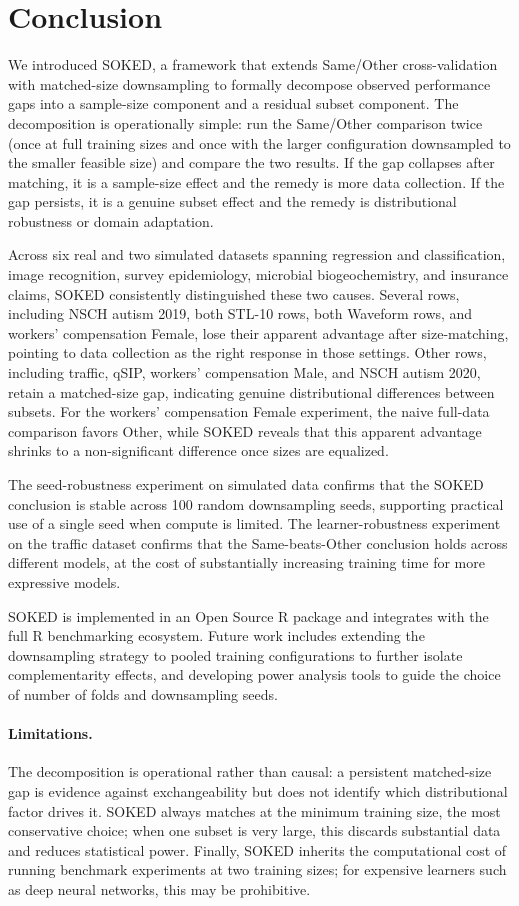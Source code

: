 \documentclass{article}
\begin{document}
\section{Conclusion}
We introduced SOKED, a framework that extends Same/Other cross-validation with matched-size downsampling to formally decompose observed performance gaps into a sample-size component and a residual subset component.
The decomposition is operationally simple: run the Same/Other comparison twice (once at full training sizes and once with the larger configuration downsampled to the smaller feasible size) and compare the two results.
If the gap collapses after matching, it is a sample-size effect and the remedy is more data collection.
If the gap persists, it is a genuine subset effect and the remedy is distributional robustness or domain adaptation.

Across six real and two simulated datasets spanning regression and classification, image recognition, survey epidemiology, microbial biogeochemistry, and insurance claims, SOKED consistently distinguished these two causes.
Several rows, including NSCH autism 2019, both STL-10 rows, both Waveform rows, and workers' compensation Female, lose their apparent advantage after size-matching, pointing to data collection as the right response in those settings.
Other rows, including traffic, qSIP, workers' compensation Male, and NSCH autism 2020, retain a matched-size gap, indicating genuine distributional differences between subsets.
For the workers' compensation Female experiment, the naive full-data comparison favors Other, while SOKED reveals that this apparent advantage shrinks to a non-significant difference once sizes are equalized.

The seed-robustness experiment on simulated data confirms that the SOKED conclusion is stable across 100 random downsampling seeds, supporting practical use of a single seed when compute is limited.
The learner-robustness experiment on the traffic dataset confirms that the Same-beats-Other conclusion holds across different models, at the cost of substantially increasing training time for more expressive models.

SOKED is implemented in an Open Source R package and integrates with the full R benchmarking ecosystem.
Future work includes extending the downsampling strategy to pooled training configurations to further isolate complementarity effects, and developing power analysis tools to guide the choice of number of folds and downsampling seeds.

\paragraph{Limitations.}
The decomposition is operational rather than causal: a persistent matched-size gap is evidence against exchangeability but does not identify which distributional factor drives it.
SOKED always matches at the minimum training size, the most conservative choice; when one subset is very large, this discards substantial data and reduces statistical power.
Finally, SOKED inherits the computational cost of running benchmark experiments at two training sizes; for expensive learners such as deep neural networks, this may be prohibitive.
\end{document}
